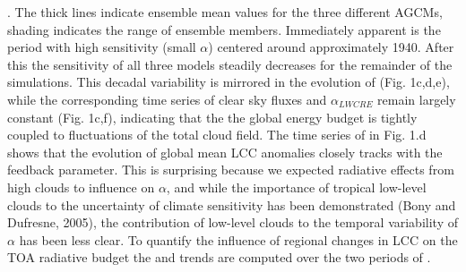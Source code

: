 .  
The thick lines indicate ensemble mean values for the three different AGCMs, shading indicates the range of ensemble members.  Immediately apparent is the period with high sensitivity (small $\alpha$) centered around approximately 1940.  After this the sensitivity of all three models steadily decreases for the remainder of the simulations.  This decadal variability is mirrored in the evolution of   (Fig. 1c,d,e), while the corresponding time series of clear sky fluxes and $\alpha_{LW CRE}$ remain largely constant (Fig. 1c,f), indicating that the the global energy budget is tightly coupled to fluctuations of the total cloud field.   
The time series of  in Fig. 1.d shows that the evolution of global mean LCC anomalies closely tracks with the feedback parameter.  This is surprising because we expected radiative effects from high clouds to  influence on $\alpha$, and while the importance of tropical low-level clouds to the uncertainty of climate sensitivity has been demonstrated (Bony and Dufresne, 2005), the contribution of  low-level clouds to the temporal variability of $\alpha$ has been less clear.  
To quantify the influence of regional changes in LCC on the TOA radiative budget the  and  trends are computed over the two periods of 
.    

